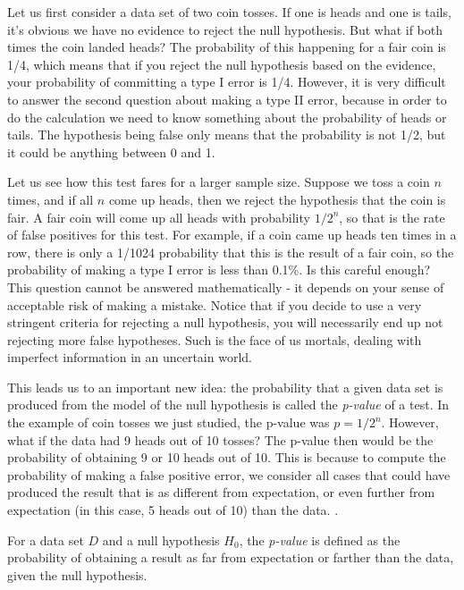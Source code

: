 \documentclass[
  letterpaper,
  DIV=11,
  numbers=noendperiod]{scrreprt}
\begin{document}
Let us first consider a data set of two coin tosses. If one is heads and
one is tails, it's obvious we have no evidence to reject the null
hypothesis. But what if both times the coin landed heads? The
probability of this happening for a fair coin is 1/4, which means that
if you reject the null hypothesis based on the evidence, your
probability of committing a type I error is 1/4. However, it is very
difficult to answer the second question about making a type II error,
because in order to do the calculation we need to know something about
the probability of heads or tails. The hypothesis being false only means
that the probability is not 1/2, but it could be anything between 0 and
1.

Let us see how this test fares for a larger sample size. Suppose we toss
a coin \(n\) times, and if all \(n\) come up heads, then we reject the
hypothesis that the coin is fair. A fair coin will come up all heads
with probability \(1/2^n\), so that is the rate of false positives for
this test. For example, if a coin came up heads ten times in a row,
there is only a 1/1024 probability that this is the result of a fair
coin, so the probability of making a type I error is less than 0.1\%. Is
this careful enough? This question cannot be answered mathematically -
it depends on your sense of acceptable risk of making a mistake. Notice
that if you decide to use a very stringent criteria for rejecting a null
hypothesis, you will necessarily end up not rejecting more false
hypotheses. Such is the face of us mortals, dealing with imperfect
information in an uncertain world.

This leads us to an important new idea: the probability that a given
data set is produced from the model of the null hypothesis is called the
\emph{p-value} of a test. In the example of coin tosses we just studied,
the p-value was \(p=1/2^n\). However, what if the data had 9 heads out
of 10 tosses? The p-value then would be the probability of obtaining 9
or 10 heads out of 10. This is because to compute the probability of
making a false positive error, we consider all cases that could have
produced the result that is as different from expectation, or even
further from expectation (in this case, 5 heads out of 10) than the
data. \cite{whitlock_analysis_2008}.

\begin{tcolorbox}[enhanced jigsaw, arc=.35mm, colframe=quarto-callout-note-color-frame, left=2mm, opacitybacktitle=0.6, breakable, title=\textcolor{quarto-callout-note-color}{\faInfo}\hspace{0.5em}{Definition}, toprule=.15mm, coltitle=black, bottomtitle=1mm, toptitle=1mm, colback=white, leftrule=.75mm, colbacktitle=quarto-callout-note-color!10!white, titlerule=0mm, opacityback=0, rightrule=.15mm, bottomrule=.15mm]

For a data set \(D\) and a null hypothesis \(H_0\), the \emph{p-value}
is defined as the probability of obtaining a result as far from
expectation or farther than the data, given the null hypothesis.

\end{tcolorbox}
\end{document}
